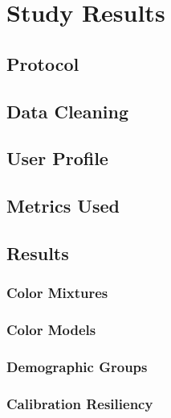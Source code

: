 
\chapter{Study Results}
\label{chapter:results}

\section{Protocol}
\label{sec:results_protocol}

\section{Data Cleaning}
\label{sec:results_datacleaning}

\section{User Profile}
\label{sec:results_userprofile}

\section{Metrics Used}
\label{sec:results_metrics}

\section{Results}
\label{sec:results_results}

\subsection{Color Mixtures}
\label{subsec:results_colormixtures}

\subsection{Color Models}
\label{subsec:results_colormodels}

\subsection{Demographic Groups}
\label{subsec:results_demographic}

\subsection{Calibration Resiliency}
\label{subsec:results_calibration}

